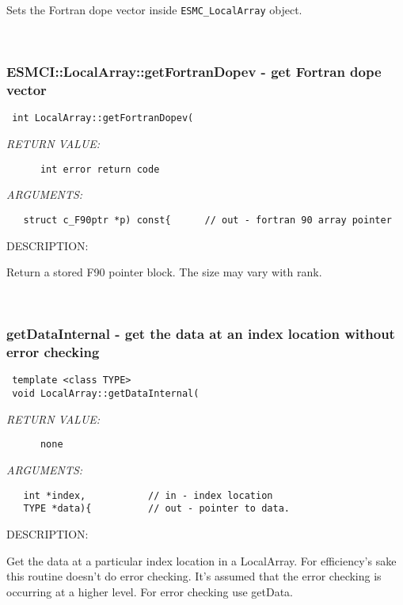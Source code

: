     Sets the Fortran dope vector inside {\tt ESMC\_LocalArray} object.
   
 
\mbox{}\hrulefill\
 
\subsubsection [ESMCI::LocalArray::getFortranDopev] {ESMCI::LocalArray::getFortranDopev - get Fortran dope vector}


  
\begin{verbatim} int LocalArray::getFortranDopev(\end{verbatim}{\em RETURN VALUE:}
\begin{verbatim}      int error return code\end{verbatim}{\em ARGUMENTS:}
\begin{verbatim}   struct c_F90ptr *p) const{      // out - fortran 90 array pointer\end{verbatim}
{\sf DESCRIPTION:\\ }


       Return a stored F90 pointer block.  The size may vary with rank.
   
 
\mbox{}\hrulefill\
 
\subsubsection [getDataInternal] {getDataInternal - get the data at an index location without error checking}


  
\begin{verbatim} template <class TYPE>
 void LocalArray::getDataInternal(\end{verbatim}{\em RETURN VALUE:}
\begin{verbatim}      none\end{verbatim}{\em ARGUMENTS:}
\begin{verbatim}   int *index,           // in - index location
   TYPE *data){          // out - pointer to data. \end{verbatim}
{\sf DESCRIPTION:\\ }


    Get the data at a particular index location in a LocalArray. For
    efficiency's sake this routine doesn't do error checking. It's assumed 
    that the error checking is occurring at a higher level. For error checking
    use getData.
   
